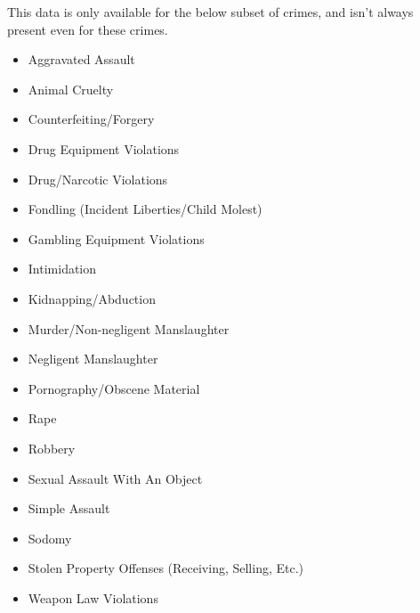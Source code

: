 \documentclass[
]{krantz}
\providecommand{\tightlist}{%
  \setlength{\itemsep}{0pt}\setlength{\parskip}{0pt}}
\begin{document}
This data is only available for the below subset of crimes,
and isn't always present even for these crimes.

\begin{itemize}
\tightlist
\item
  Aggravated Assault
\item
  Animal Cruelty
\item
  Counterfeiting/Forgery
\item
  Drug Equipment Violations
\item
  Drug/Narcotic Violations
\item
  Fondling (Incident Liberties/Child Molest)
\item
  Gambling Equipment Violations
\item
  Intimidation
\item
  Kidnapping/Abduction
\item
  Murder/Non-negligent Manslaughter
\item
  Negligent Manslaughter
\item
  Pornography/Obscene Material
\item
  Rape
\item
  Robbery
\item
  Sexual Assault With An Object
\item
  Simple Assault
\item
  Sodomy
\item
  Stolen Property Offenses (Receiving, Selling, Etc.)
\item
  Weapon Law Violations
\end{itemize}
\end{document}
